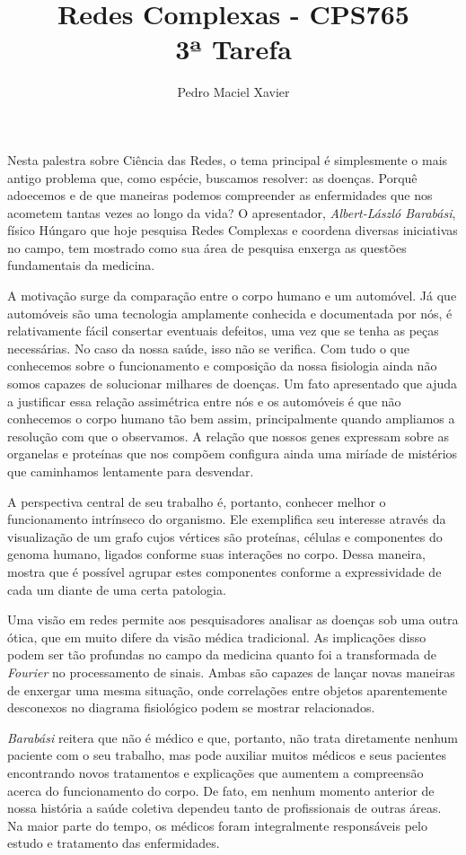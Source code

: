 \documentclass{homework}
\title{Redes Complexas - CPS765 \\[1ex]%
3ª Tarefa}
\author{Pedro Maciel Xavier}
\begin{document}
    \smaketitle %
    
    Nesta palestra sobre Ciência das Redes, o tema principal é simplesmente o mais antigo problema que, como espécie, buscamos resolver: as doenças. Porquê adoecemos e de que maneiras podemos compreender as enfermidades que nos acometem tantas vezes ao longo da vida? O apresentador, \textit{Albert-László Barabási}, físico Húngaro que hoje pesquisa Redes Complexas e coordena diversas iniciativas no campo, tem mostrado como sua área de pesquisa enxerga as questões fundamentais da medicina.%
    \par
    A motivação surge da comparação entre o corpo humano e um automóvel. Já que automóveis são uma tecnologia amplamente conhecida e documentada por nós, é relativamente fácil consertar eventuais defeitos, uma vez que se tenha as peças necessárias. No caso da nossa saúde, isso não se verifica. Com tudo o que conhecemos sobre o funcionamento e composição da nossa fisiologia ainda não somos capazes de solucionar milhares de doenças. Um fato apresentado que ajuda a justificar essa relação assimétrica entre nós e os automóveis é que não conhecemos o corpo humano tão bem assim, principalmente quando ampliamos a resolução com que o observamos. A relação que nossos genes expressam sobre as organelas e proteínas que nos compõem configura ainda uma miríade de mistérios que caminhamos lentamente para desvendar.%
    \par
    A perspectiva central de seu trabalho é, portanto, conhecer melhor o funcionamento intrínseco do organismo. Ele exemplifica seu interesse através da visualização de um grafo cujos vértices são proteínas, células e componentes do genoma humano, ligados conforme suas interações no corpo. Dessa maneira, mostra que é possível agrupar estes componentes conforme a expressividade de cada um diante de uma certa patologia.%
    \par
    Uma visão em redes permite aos pesquisadores analisar as doenças sob uma outra ótica, que em muito difere da visão médica tradicional. As implicações disso podem ser tão profundas no campo da medicina quanto foi a transformada de \textit{Fourier} no processamento de sinais. Ambas são capazes de lançar novas maneiras de enxergar uma mesma situação, onde correlações entre objetos aparentemente desconexos no diagrama fisiológico podem se mostrar relacionados.%
	\par
	\textit{Barabási} reitera que não é médico e que, portanto, não trata diretamente nenhum paciente com o seu trabalho, mas pode auxiliar muitos médicos e seus pacientes encontrando novos tratamentos e explicações que aumentem a compreensão acerca do funcionamento do corpo. De fato, em nenhum momento anterior de nossa história a saúde coletiva dependeu tanto de profissionais de outras áreas. Na maior parte do tempo, os médicos foram integralmente responsáveis pelo estudo e tratamento das enfermidades.%
\end{document}
